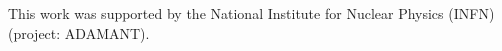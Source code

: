 \documentclass[
reprint,
amsmath,amssymb,
aps,
showkeys
]{revtex4-2}
\begin{document}
\begin{acknowledgments}
This work was supported by the National Institute for Nuclear Physics (INFN) (project: ADAMANT).
\end{acknowledgments}


\begin{comment}
\appendix

\section{Appendixes}
\end{comment}

\end{document}
